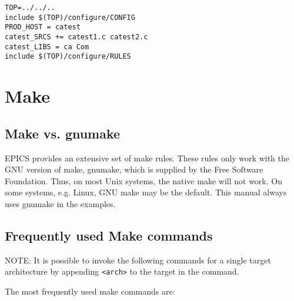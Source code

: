 \begin{verbatim}
TOP=../../..
include $(TOP)/configure/CONFIG
PROD_HOST = catest
catest_SRCS += catest1.c catest2.c
catest_LIBS = ca Com
include $(TOP)/configure/RULES
\end{verbatim}

\section{Make}

\subsection{Make vs. gnumake}

EPICS provides an extensive set of make rules. These rules only work with the GNU version of make, gnumake, which is 
supplied by the Free Software Foundation. Thus, on most Unix systems, the native make will not work. On some systems, 
e.g. Linux, GNU make may be the default. This manual always uses gnumake in the examples. 

\subsection{Frequently used Make commands }

NOTE: It is possible to invoke the following commands for a single target architecture by appending \verb|<arch>| to the target 
in the command. 

The most frequently used make commands are:

